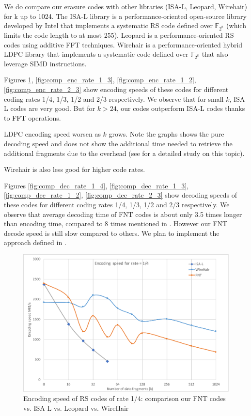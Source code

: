 \documentclass[oneside,9pt]{article}
\newcommand{\gf}[2][]{ \mathbb{F}_{{#2}^{#1}} }
\begin{document}
We do compare our erasure codes with other libraries (ISA-L, Leopard, Wirehair) for k up to 1024. The ISA-L library \cite{isal} is a performance-oriented open-source library developed by Intel that implements a systematic RS code defined over $\gf{2^8}$ (which limits the code length to at most 255). Leopard \cite{leopard} is a performance-oriented RS codes using additive FFT techniques. Wirehair \cite{wirehair} is a performance-oriented hybrid LDPC library that implements a systematic code defined over $\gf{2^8}$ that also leverage SIMD instructions.

Figures \ref{fig:comp_enc_rate_1_4}, \ref{fig:comp_enc_rate_1_3}, \ref{fig:comp_enc_rate_1_2}, \ref{fig:comp_enc_rate_2_3} show encoding speeds of these codes for different coding rates 1/4, 1/3, 1/2 and 2/3 respectively. We observe that for small $k$, ISA-L codes are very good. But for $k > 24$, our codes outperform ISA-L codes thanks to FFT operations. 

LDPC encoding speed worsen as $k$ grows. Note the graphs shows the pure decoding speed and does not show the additional time needed to retrieve the additional fragments due to the overhead (see \cite{plank_ldpc} for a detailed study on this topic).

Wirehair is also less good for higher code rates.

Figures \ref{fig:comp_dec_rate_1_4}, \ref{fig:comp_dec_rate_1_3}, \ref{fig:comp_dec_rate_1_2}, \ref{fig:comp_dec_rate_2_3} show decoding speeds of these codes for different coding rates 1/4, 1/3, 1/2 and 2/3 respectively. We observe that average decoding time of FNT codes is about only 3.5 times longer than encoding time, compared to 8 times mentioned in \cite{fnt_lacan}. However our FNT decode speed is still slow compared to others. We plan to implement the approach defined in \cite{fnt_ida}.

\begin{figure}[!ht]
\centering
\includegraphics[width=0.7\columnwidth]{Enc_Rate1-4.pdf}
\caption{Encoding speed of RS codes of rate 1/4: comparison our FNT codes vs. ISA-L vs. Leopard vs. WireHair}
\label{fig:comp_enc_rate_1_4}
\end{figure}
\end{document}
